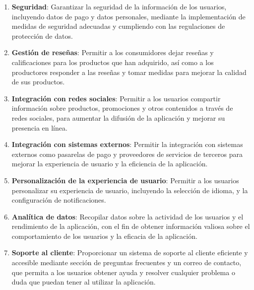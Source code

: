 \begin{enumerate}
	\item \textbf{Seguridad}: Garantizar la seguridad de la información de los usuarios, incluyendo datos de pago y datos personales, mediante la implementación de medidas de seguridad adecuadas y cumpliendo con las regulaciones de protección de datos.

	\item \textbf{Gestión de reseñas}: Permitir a los consumidores dejar reseñas y calificaciones para los productos que han adquirido, así como a los productores responder a las reseñas y tomar medidas para mejorar la calidad de sus productos.

	\item \textbf{Integración con redes sociales}: Permitir a los usuarios compartir información sobre productos, promociones y otros contenidos a través de redes sociales, para aumentar la difusión de la aplicación y mejorar su presencia en línea.

	\item \textbf{Integración con sistemas externos}: Permitir la integración con sistemas externos como pasarelas de pago y proveedores de servicios de terceros para mejorar la experiencia de usuario y la eficiencia de la aplicación.

	\item \textbf{Personalización de la experiencia de usuario}: Permitir a los usuarios personalizar su experiencia de usuario, incluyendo la selección de idioma, y la configuración de notificaciones.

	\item \textbf{Analítica de datos}: Recopilar datos sobre la actividad de los usuarios y el rendimiento de la aplicación, con el fin de obtener información valiosa sobre el comportamiento de los usuarios y la eficacia de la aplicación.

	\item \textbf{Soporte al cliente}: Proporcionar un sistema de soporte al cliente eficiente y accesible mediante sección de preguntas frecuentes y un correo de contacto, que permita a los usuarios obtener ayuda y resolver cualquier problema o duda que puedan tener al utilizar la aplicación.

\end{enumerate}